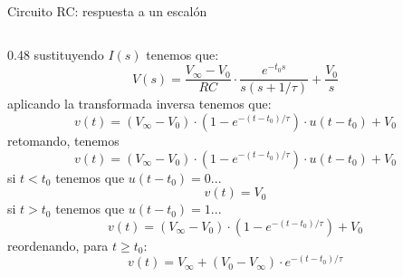 \documentclass[aspectratio=169]{beamer}
\begin{document}
\begin{frame}[t]{Circuito RC: respuesta a un escalón}
\begin{columns}[T,onlytextwidth]
\begin{column}{0.48\textwidth}
{{            }
                {sustituyendo $I(s)$ tenemos que:
                \begin{equation*}
                    V(s) = \dfrac{V_\infty - V_0}{RC}\cdot\dfrac{e^{-t_0s}}{s(s+1/\tau)} + \dfrac{V_0}{s}
                \end{equation*}
            }
                {aplicando la transformada inversa tenemos que:
                \begin{equation*}
                    v(t) = (V_\infty - V_0) \cdot (1 - e^{-(t-t_0)/\tau}) \cdot u(t-t_0) + V_0
                \end{equation*}
            }
        }
            {
            {retomando, tenemos
                \begin{equation*}
                    v(t) = (V_\infty - V_0) \cdot (1 - e^{-(t-t_0)/\tau}) \cdot u(t-t_0) + V_0
                \end{equation*}
            }
                {si $t<t_0$ tenemos que $u(t-t_0) = 0$...
                \begin{equation*}
                     v(t) = V_0
                \end{equation*}
            }
                {si $t>t_0$ tenemos que $u(t-t_0) = 1$...
                \begin{equation*}
                     v(t) = (V_\infty - V_0) \cdot (1 - e^{-(t-t_0)/\tau}) + V_0
                \end{equation*}
            }
                {reordenando, para $t\geq t_0$: 
                \begin{equation*}
                     v(t) = V_\infty + (V_0 - V_\infty) \cdot e^{-(t-t_0)/\tau}
                \end{equation*}
            }
        }
    \end{column}
\end{columns}
\end{frame}
\end{document}
